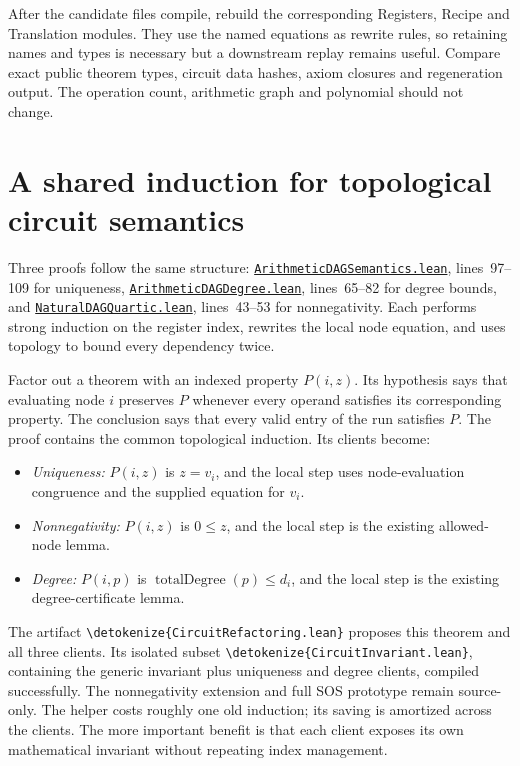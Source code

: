 \documentclass[11pt,letterpaper]{article}
\newcommand{\code}[1]{\expandafter\nolinkurl\expandafter{\detokenize{#1}}}
\newcommand{\repo}{https://github.com/VladimirReshetnikov/ProveIt/blob/60e9c5d620c6c387d932876cfa2d9376f64ea56c}
\newcommand{\src}[2]{\href{\repo/Computability/DiophantineConsistency/Lean/DiophantineConsistency/#1.lean}{\nolinkurl{#1.lean}}, lines~#2}
\begin{document}
After the candidate files compile, rebuild the corresponding Registers, Recipe and Translation modules. They use the named equations as rewrite rules, so retaining names and types is necessary but a downstream replay remains useful. Compare exact public theorem types, circuit data hashes, axiom closures and regeneration output. The operation count, arithmetic graph and polynomial should not change.

\section{A shared induction for topological circuit semantics}

Three proofs follow the same structure: \src{ArithmeticDAGSemantics}{97--109} for uniqueness, \src{ArithmeticDAGDegree}{65--82} for degree bounds, and \src{NaturalDAGQuartic}{43--53} for nonnegativity. Each performs strong induction on the register index, rewrites the local node equation, and uses topology to bound every dependency twice.

Factor out a theorem with an indexed property $P(i,z)$. Its hypothesis says that evaluating node $i$ preserves $P$ whenever every operand satisfies its corresponding property. The conclusion says that every valid entry of the run satisfies $P$. The proof contains the common topological induction. Its clients become:

\begin{itemize}
\item \emph{Uniqueness:} $P(i,z)$ is $z=v_i$, and the local step uses node-evaluation congruence and the supplied equation for $v_i$.
\item \emph{Nonnegativity:} $P(i,z)$ is $0\le z$, and the local step is the existing allowed-node lemma.
\item \emph{Degree:} $P(i,p)$ is $\operatorname{totalDegree}(p)\le d_i$, and the local step is the existing degree-certificate lemma.
\end{itemize}

The artifact \code{CircuitRefactoring.lean} proposes this theorem and all three clients. Its isolated subset \code{CircuitInvariant.lean}, containing the generic invariant plus uniqueness and degree clients, compiled successfully. The nonnegativity extension and full SOS prototype remain source-only. The helper costs roughly one old induction; its saving is amortized across the clients. The more important benefit is that each client exposes its own mathematical invariant without repeating index management.
\end{document}
